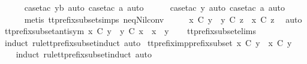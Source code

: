\ \ \ \ \isamarkupfalse%
\ {\isacharparenleft}case{\isacharunderscore}tac\ yb{\isacharcomma}\ auto{\isacharcomma}\ case{\isacharunderscore}tac\ a{\isacharcomma}\ auto{\isacharparenright}\isanewline
\ \ \ \ \isamarkupfalse%
\ {\isacharparenleft}case{\isacharunderscore}tac\ y{\isacharcomma}\ auto{\isacharcomma}\ case{\isacharunderscore}tac\ a{\isacharcomma}\ auto{\isacharparenright}{\isacharplus}\isanewline
\ \ \ \ \isamarkupfalse%
\ {\isacharparenleft}metis\ tt{\isacharunderscore}prefix{\isacharunderscore}subset{\isachardot}simps{\isacharparenleft}{}{\isacharparenright}\ neq{\isacharunderscore}Nil{\isacharunderscore}conv{\isacharparenright}\isanewline
\ \ \isamarkupfalse%
\ \isamarkupfalse%
\ {\isachardoublequoteopen}x\ {\isasymlesssim}\isactrlsub C\ y\ {\isasymLongrightarrow}\ y\ {\isasymlesssim}\isactrlsub C\ z\ {\isasymLongrightarrow}\ x\ {\isasymlesssim}\isactrlsub C\ z{\isachardoublequoteclose}\ \isamarkupfalse%
\ auto\isanewline
{}\isamarkupfalse%
%
\endisatagproof
{\isafoldproof}%
%
\isadelimproof
\isanewline
%
\endisadelimproof
\isanewline
{}\isamarkupfalse%
\ tt{\isacharunderscore}prefix{\isacharunderscore}subset{\isacharunderscore}antisym{\isacharcolon}\ {\isachardoublequoteopen}x\ {\isasymlesssim}\isactrlsub C\ y\ {\isasymLongrightarrow}\ y\ {\isasymlesssim}\isactrlsub C\ x\ {\isasymLongrightarrow}\ x\ {\isacharequal}\ y{\isachardoublequoteclose}\isanewline
%
\isadelimproof
\ \ %
\endisadelimproof
%
\isatagproof
{}\isamarkupfalse%
\ tt{\isacharunderscore}prefix{\isacharunderscore}subset{\isachardot}elims{\isacharparenleft}{}{\isacharparenright}\ \isamarkupfalse%
\ {\isacharparenleft}induct\ rule{\isacharcolon}tt{\isacharunderscore}prefix{\isacharunderscore}subset{\isachardot}induct{\isacharcomma}\ auto{\isacharparenright}%
\endisatagproof
{\isafoldproof}%
%
\isadelimproof
\isanewline
%
\endisadelimproof
\isanewline
{}\isamarkupfalse%
\ tt{\isacharunderscore}prefix{\isacharunderscore}imp{\isacharunderscore}prefix{\isacharunderscore}subset{\isacharcolon}\ {\isachardoublequoteopen}x\ {\isasymle}\isactrlsub C\ y\ {\isasymLongrightarrow}\ x\ {\isasymlesssim}\isactrlsub C\ y{\isachardoublequoteclose}\isanewline
%
\isadelimproof
\ \ %
\endisadelimproof
%
\isatagproof
{}\isamarkupfalse%
\ {\isacharparenleft}induct\ rule{\isacharcolon}tt{\isacharunderscore}prefix{\isacharunderscore}subset{\isachardot}induct{\isacharcomma}\ auto{\isacharparenright}%
